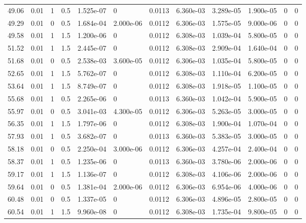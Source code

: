 \documentclass[preview]{standalone}
\begin{document}
{{{\begin{tabular}{L{1.2cm}C{1.2cm} C{0.3cm}C{0.5cm} C{1.4cm}C{1.4cm} C{1.4cm}C{1.4cm} C{1.6cm}C{1.6cm} C{1.6cm}C{1.6cm}}
  49.06  &  0.01  & 1     & 0.5 &  1.525e-07  & 0  &  0.0113&   6.360e-03& 3.289e-05 & 1.900e-05   &  0 & 0  \\ 
  49.29  &  0.01  & 0     & 0.5 &  1.684e-04  & 2.000e-06  &  0.0112&   6.306e-03& 1.575e-05 & 9.000e-06   &  0 & 0  \\ 
  49.58  &  0.01  & 1     & 1.5 &  1.200e-06  & 0  &  0.0112&   6.308e-03& 1.039e-04 & 5.800e-05   &  0 & 0  \\ 
  51.52  &  0.01  & 1     & 1.5 &  2.445e-07  & 0  &  0.0112&   6.308e-03& 2.909e-04 & 1.640e-04   &  0 & 0  \\ 
  51.68  &  0.01  & 0     & 0.5 &  2.538e-03  & 3.600e-05  &  0.0112&   6.306e-03& 1.035e-04 & 5.800e-05   &  0 & 0  \\ 
  52.65  &  0.01  & 1     & 1.5 &  5.762e-07  & 0  &  0.0112&   6.308e-03& 1.110e-04 & 6.200e-05   &  0 & 0  \\ 
  53.64  &  0.01  & 1     & 1.5 &  8.749e-07  & 0  &  0.0112&   6.308e-03& 1.918e-05 & 1.100e-05   &  0 & 0  \\ 
  55.68  &  0.01  & 1     & 0.5 &  2.265e-06  & 0  &  0.0113&   6.360e-03& 1.042e-04 & 5.900e-05   &  0 & 0  \\ 
  55.97  &  0.01  & 0     & 0.5 &  3.041e-03  & 4.300e-05  &  0.0112&   6.306e-03& 5.263e-05 & 3.000e-05   &  0 & 0  \\ 
  56.35  &  0.01  & 1     & 1.5 &  1.797e-06  & 0  &  0.0112&   6.308e-03& 1.900e-04 & 1.070e-04   &  0 & 0  \\ 
  57.93  &  0.01  & 1     & 0.5 &  3.682e-07  & 0  &  0.0113&   6.360e-03& 5.383e-05 & 3.000e-05   &  0 & 0  \\ 
  58.18  &  0.01  & 0     & 0.5 &  2.250e-04  & 3.000e-06  &  0.0112&   6.306e-03& 4.257e-04 & 2.400e-04   &  0 & 0  \\ 
  58.37  &  0.01  & 1     & 0.5 &  1.235e-06  & 0  &  0.0113&   6.360e-03& 3.780e-06 & 2.000e-06   &  0 & 0  \\ 
  59.17  &  0.01  & 1     & 1.5 &  1.136e-07  & 0  &  0.0112&   6.308e-03& 4.106e-06 & 2.000e-06   &  0 & 0  \\ 
  59.64  &  0.01  & 0     & 0.5 &  1.381e-04  & 2.000e-06  &  0.0112&   6.306e-03& 6.954e-06 & 4.000e-06   &  0 & 0  \\ 
  60.48  &  0.01  & 0     & 0.5 &  1.337e-05  & 0  &  0.0112&   6.306e-03& 4.896e-05 & 2.800e-05   &  0 & 0  \\ 
  60.54  &  0.01  & 1     & 1.5 &  9.960e-08  & 0  &  0.0112&   6.308e-03& 1.735e-04 & 9.800e-05   &  0 & 0  \\ 

\end{tabular}}}}
\end{document}
